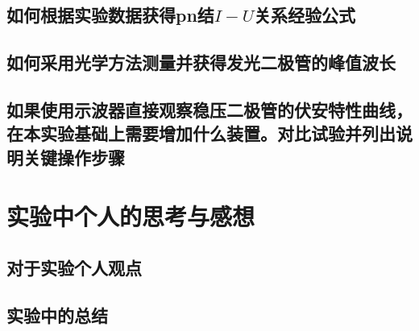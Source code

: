 \documentclass{ctexart}
\begin{document}
  \subsection{如何根据实验数据获得pn结$I-U$关系经验公式}

  \subsection{如何采用光学方法测量并获得发光二极管的峰值波长}

  \subsection{如果使用示波器直接观察稳压二极管的伏安特性曲线，在本实验基础上需要增加什么装置。对比试验并列出说明关键操作步骤}
\newpage

\section{实验中个人的思考与感想}
  \subsection{对于实验个人观点}

  \subsection{实验中的总结}
\end{document}
